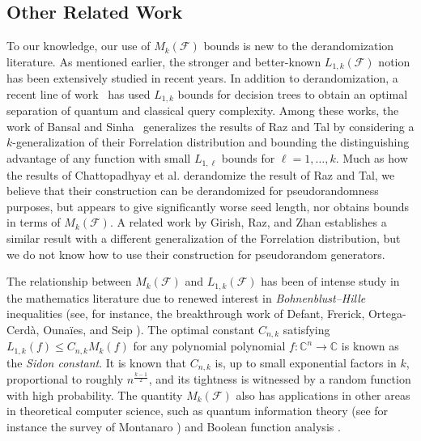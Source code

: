 \documentclass[10pt,a4paper]{article}
\theoremstyle{definition}
\begin{document}
\subsection{Other Related Work}
{To our knowledge, our use of $M_k(\mathcal{F})$ bounds is new to the derandomization literature.  As mentioned earlier, the stronger and better-known $L_{1,k}(\mathcal{F})$ notion has been extensively studied in recent years.  In addition to derandomization, a recent line of work~\cite{DBLP:journals/eccc/Tal19,DBLP:journals/corr/abs-2008-07003,DBLP:journals/eccc/SherstovSW20} has used $L_{1,k}$ bounds for decision trees to
%
obtain an optimal separation of quantum and classical query complexity.  
Among these works, the work of Bansal and Sinha~\cite{DBLP:journals/corr/abs-2008-07003} generalizes the results of Raz and Tal \cite{RazTal} by considering a $k$-generalization of their Forrelation distribution and bounding the distinguishing advantage of any function with small $L_{1,\ell}$ bounds for $\ell=1,\ldots,k$. 
Much as how the results of Chattopadhyay {et al.} \cite{CHLT} derandomize the result of Raz and Tal, we believe that their construction can be derandomized for pseudorandomness purposes, but appears to give significantly worse seed length, nor obtains bounds in terms of $M_k(\mathcal{F})$. A related work by Girish, Raz, and Zhan \cite{RazXOR} establishes a similar result with a different generalization of the Forrelation distribution, but we do not know how to use their construction for pseudorandom generators.}

%
%

{The relationship between $M_k(\mathcal{F})$ and $L_{1,k}(\mathcal{F})$ has been of intense study in the mathematics literature due to renewed interest in \emph{Bohnenblust--Hille} inequalities (see, for instance, the breakthrough work of Defant, Frerick, Ortega-Cerd\`a, Ouna\"ies, and Seip \cite{defant2011bohnenblust}). The optimal constant $C_{n,k}$ satisfying $L_{1,k}(f)\leq C_{n,k}M_k(f)$ for any polynomial polynomial $f\colon\mathbb{C}^n\to \mathbb{C}$ is known as the \emph{Sidon constant}. It is known that $C_{n,k}$ is, up to small exponential factors in $k$, proportional to roughly $n^{\frac{k-1}{2}}$, and its tightness is witnessed by a random function with high probability.
%
%
The quantity $M_k(\mathcal{F})$ also has applications in other areas in theoretical computer science, such as quantum information theory (see for instance the survey of Montanaro \cite{montanaro2012some}) and Boolean function analysis \cite{DBLP:conf/stacs/Arunachalam0KSW20}.}
\end{document}
